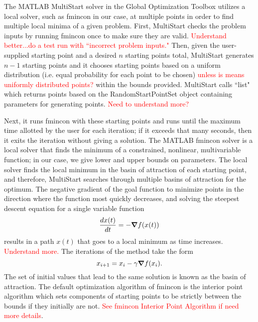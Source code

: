\documentclass[12pt]{article}
\begin{document}
The MATLAB MultiStart solver in the Global Optimization Toolbox utilizes a local solver, such as fmincon in our case, at multiple points in order to find multiple local minima of a given problem. %
First, MultiStart checks the problem inputs by running fmincon once to make sure they are valid. \textcolor{red}{Understand better...do a test run with ``incorrect problem inputs."} Then, given the user-supplied starting point and a desired $n$ starting points total, MultiStart generates $n-1$ starting points and it chooses starting points based on a uniform distribution (i.e. equal probability for each point to be chosen) \textcolor{red}{unless is means uniformly distributed points?} within the bounds provided. MultiStart calls ``list" which returns points based on the RandomStartPointSet object containing parameters for generating points. \textcolor{red}{Need to understand more?} %

Next, it runs fmincon with these starting points and runs until the maximum time allotted by the user for each iteration; if it exceeds that many seconds, then it exits the iteration without giving a solution.
The MATLAB fmincon solver is a local solver that finds the minimum of a constrained, nonlinear, multivariable function; in our case, we give lower and upper bounds on parameters. The local solver finds the local minimum in the basin of attraction of each starting point, and therefore, MultiStart searches through multiple basins of attraction for the optimum.  %
The negative gradient of the goal function to minimize points in the direction where the function most quickly decreases, and solving the steepest descent equation for a single variable function
$$\frac{dx(t)}{dt}=-\grad f(x(t))$$
results in a path $x(t)$ that goes to a local minimum as time increases. \textcolor{red}{Understand more.} The iterations of the method take the form 
$$x_{i+1}=x_{i}-\gamma \grad f(x_i).$$ %
The set of initial values that lead to the same solution is known as the basin of attraction. %
The default optimization algorithm of fmincon is the interior point algorithm which sets components of starting points to be strictly between the bounds if they initially are not. \textcolor{red}{See fmincon Interior Point Algorithm if need more details}.%
\end{document}

